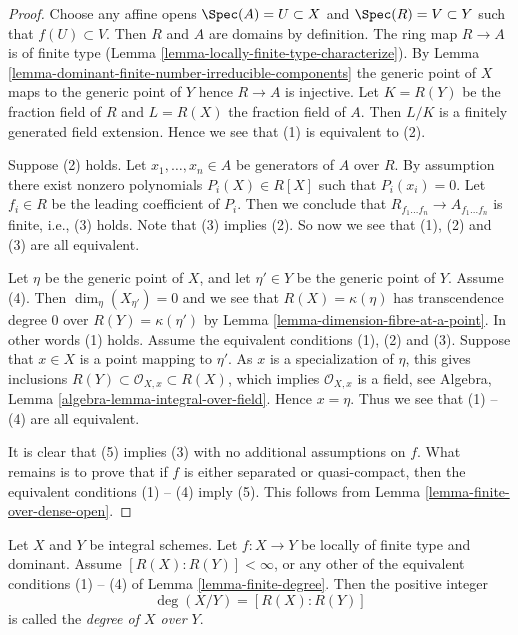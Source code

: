 \begin{proof}
Choose any affine opens $\Spec(A) = U \subset X$
and $\Spec(R) = V \subset Y$ such that $f(U) \subset V$.
Then $R$ and $A$ are domains by definition. The ring map
$R \to A$ is of finite type
(Lemma \ref{lemma-locally-finite-type-characterize}).
By Lemma \ref{lemma-dominant-finite-number-irreducible-components}
the generic point of $X$ maps to the generic point of $Y$
hence $R \to A$ is injective. Let $K = R(Y)$ be the fraction field
of $R$ and $L = R(X)$ the fraction field of $A$. Then $L/K$
is a finitely generated field extension. Hence we see that
(1) is equivalent to (2).

\medskip\noindent
Suppose (2) holds. Let $x_1, \ldots, x_n \in A$ be generators
of $A$ over $R$. By assumption there exist nonzero polynomials
$P_i(X) \in R[X]$ such that $P_i(x_i) = 0$. Let $f_i \in R$ be the
leading coefficient of $P_i$. Then we conclude that
$R_{f_1 \ldots f_n} \to A_{f_1 \ldots f_n}$ is finite, i.e., (3) holds.
Note that (3) implies (2). So now we see that (1), (2) and (3) are all
equivalent.

\medskip\noindent
Let $\eta$ be the generic point of $X$, and let $\eta' \in Y$ be the
generic point of $Y$. Assume (4). Then
$\dim_\eta(X_{\eta'}) = 0$ and we see that $R(X) = \kappa(\eta)$ has
transcendence degree $0$ over $R(Y) = \kappa(\eta')$ by
Lemma \ref{lemma-dimension-fibre-at-a-point}.
In other words (1) holds. Assume the equivalent conditions (1), (2) and
(3). Suppose that $x \in X$ is a point mapping to $\eta'$.
As $x$ is a specialization of $\eta$,
this gives inclusions $R(Y) \subset \mathcal{O}_{X, x} \subset R(X)$,
which implies $\mathcal{O}_{X, x}$ is a field, see
Algebra, Lemma \ref{algebra-lemma-integral-over-field}.
Hence $x = \eta$. Thus we see that (1) -- (4)
are all equivalent.

\medskip\noindent
It is clear that (5) implies (3) with no additional assumptions on
$f$. What remains is to prove that if $f$ is either separated or
quasi-compact, then the equivalent conditions (1) -- (4) imply (5).
This follows from Lemma \ref{lemma-finite-over-dense-open}.
\end{proof}

\begin{definition}
\label{definition-degree}
Let $X$ and $Y$ be integral schemes.
Let $f : X \to Y$ be locally of finite type and dominant.
Assume $[R(X) : R(Y)] < \infty$, or any other of the equivalent
conditions (1) -- (4) of Lemma \ref{lemma-finite-degree}.
Then the positive integer
$$
\deg(X/Y) = [R(X) : R(Y)]
$$
is called the {\it degree of $X$ over $Y$}.
\end{definition}

